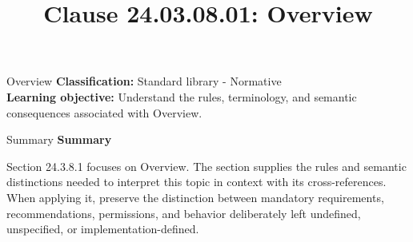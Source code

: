 \documentclass[10pt,letterpaper]{article}
\title{Clause 24.03.08.01: Overview}
\author{}
\date{}
\begin{document}
\maketitle
\begin{CornellOverviewBox}{Overview}
\textbf{Classification:} Standard library - Normative\\[2pt]
\textbf{Learning objective:} Understand the rules, terminology, and semantic consequences associated with Overview.
\end{CornellOverviewBox}\begin{CornellSummaryBox}{Summary}
{\sffamily\bfseries\color{Accent} Summary}\par\vspace{3pt}Section 24.3.8.1 focuses on Overview. The section supplies the rules and semantic distinctions needed to interpret this topic in context with its cross-references. When applying it, preserve the distinction between mandatory requirements, recommendations, permissions, and behavior deliberately left undefined, unspecified, or implementation-defined.
\end{CornellSummaryBox}
\end{document}
